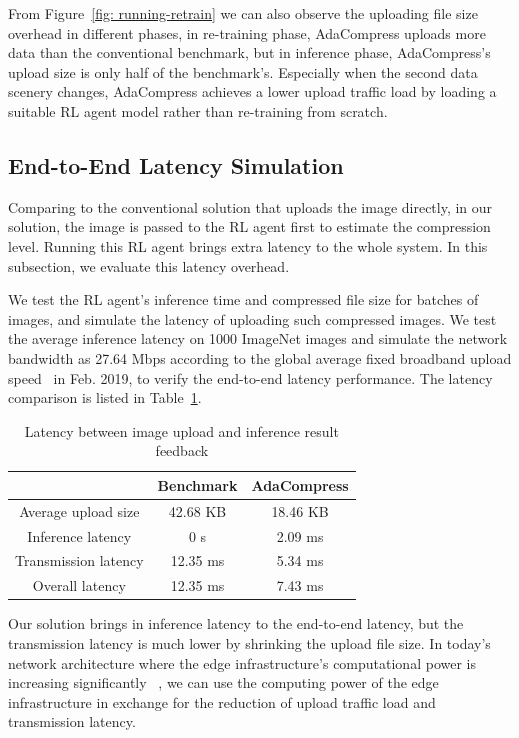 From Figure~\ref{fig: running-retrain} we can also observe the uploading file size overhead in different phases, in re-training phase, AdaCompress uploads more data than the conventional benchmark, but in inference phase, AdaCompress's upload size is only half of the benchmark's. Especially when the second data scenery changes, AdaCompress achieves a lower upload traffic load by loading a suitable RL agent model rather than re-training from scratch. %

\subsection{End-to-End Latency Simulation}

Comparing to the conventional solution that uploads the image directly, in our solution, the image is passed to the RL agent first to estimate the compression level. Running this RL agent brings extra latency to the whole system. In this subsection, we evaluate this latency overhead. %

We test the RL agent's inference time and compressed file size for batches of images, and simulate the latency of uploading such compressed images. We test the average inference latency on 1000 ImageNet images and simulate the network bandwidth as 27.64 Mbps according to the global average fixed broadband upload speed~\cite{speedtest} in Feb. 2019, to verify the end-to-end latency performance. The latency comparison is listed in Table~\ref{tab: latency-overhead}. %

\begin{table}[htbp]
    \centering
    \begin{tabular}{ccc}
        \toprule
        & Benchmark & AdaCompress  \\ \midrule
        Average upload size          & 42.68 KB  &  18.46 KB            \\
        Inference latency    & 0 s       & 2.09 ms          \\
        Transmission latency & 12.35 ms       & 5.34 ms          \\
        Overall latency      & 12.35 ms       & 7.43 ms          \\ \bottomrule
    \end{tabular}
    \caption{Latency between image upload and inference result feedback}
    \label{tab: latency-overhead}
\end{table}

Our solution brings in inference latency to the end-to-end latency, but the transmission latency is much lower by shrinking the upload file size. In today's network architecture where the edge infrastructure's computational power is increasing significantly ~\cite{satyanarayanan2017emergence,hu2015mobile}, we can use the computing power of the edge infrastructure in exchange for the reduction of upload traffic load and transmission latency. %
